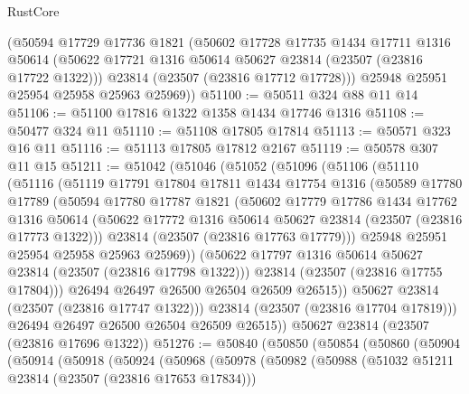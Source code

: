 \begin{lexlean}{RustCore}
\begin{coremodule}
      (@50594
        @17729
        @17736
        @1821
        (@50602
          @17728
          @17735
          @1434
          @17711
          @1316
          @50614
          (@50622 @17721 @1316 @50614 @50627 @23814 (@23507 (@23816 @17722 @1322)))
          @23814
          (@23507 (@23816 @17712 @17728)))
        @25948
        @25951
        @25954
        @25958
        @25963
        @25969))
@51100 := @50511 @324 @88 @11 @14
@51106 := @51100 @17816 @1322 @1358 @1434 @17746 @1316
@51108 := @50477 @324 @11
@51110 := @51108 @17805 @17814
@51113 := @50571 @323 @16 @11
@51116 := @51113 @17805 @17812 @2167
@51119 := @50578 @307 @11 @15
@51211 := @51042
    (@51046
      (@51052
        (@51096
          (@51106
            (@51110
              (@51116
                (@51119
                  @17791
                  @17804
                  @17811
                  @1434
                  @17754
                  @1316
                  (@50589
                    @17780
                    @17789
                    (@50594
                      @17780
                      @17787
                      @1821
                      (@50602
                        @17779
                        @17786
                        @1434
                        @17762
                        @1316
                        @50614
                        (@50622 @17772 @1316 @50614 @50627 @23814 (@23507 (@23816 @17773 @1322)))
                        @23814
                        (@23507 (@23816 @17763 @17779)))
                      @25948
                      @25951
                      @25954
                      @25958
                      @25963
                      @25969))
                  (@50622 @17797 @1316 @50614 @50627 @23814 (@23507 (@23816 @17798 @1322)))
                  @23814
                  (@23507 (@23816 @17755 @17804)))
                @26494
                @26497
                @26500
                @26504
                @26509
                @26515))
            @50627
            @23814
            (@23507 (@23816 @17747 @1322)))
          @23814
          (@23507 (@23816 @17704 @17819)))
        @26494
        @26497
        @26500
        @26504
        @26509
        @26515))
    @50627
    @23814
    (@23507 (@23816 @17696 @1322))
@51276 := @50840
    (@50850
      (@50854
        (@50860
          (@50904
            (@50914
              (@50918
                (@50924
                  (@50968
                    (@50978
                      (@50982
                        (@50988
                          (@51032 @51211 @23814 (@23507 (@23816 @17653 @17834)))

\end{coremodule}
\end{lexlean}
